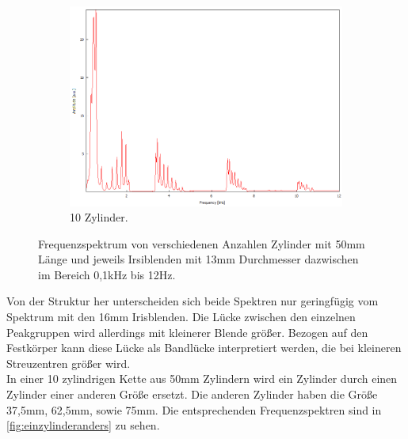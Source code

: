 \begin{figure}
\begin{subfigure}[b]{0.3\textwidth}
        \includegraphics[width=\textwidth]{data/4_2/13mm_10zylinder.png}
        \caption{10 Zylinder.}
    \end{subfigure}
    \hfill
    \caption{Frequenzspektrum von verschiedenen Anzahlen Zylinder mit 50\;mm Länge und jeweils Irsiblenden mit 13\;mm Durchmesser dazwischen im Bereich 0,1\;kHz bis 12\;Hz.}
    \label{fig:allesgleich13}
\end{figure}
Von der Struktur her unterscheiden sich beide Spektren nur geringfügig vom Spektrum mit den 
16\;mm Irisblenden. Die Lücke zwischen den einzelnen Peakgruppen wird allerdings mit kleinerer
Blende größer. Bezogen auf den Festkörper kann diese Lücke als Bandlücke interpretiert werden, 
die bei kleineren Streuzentren größer wird.\\
In einer 10 zylindrigen Kette aus 50\;mm Zylindern wird ein Zylinder durch einen Zylinder 
einer anderen Größe ersetzt. Die anderen Zylinder haben die Größe 37,5\;mm, 62,5\;mm, sowie 75\;mm.
Die entsprechenden Frequenzspektren sind in \autoref{fig:einzylinderanders} zu sehen.
